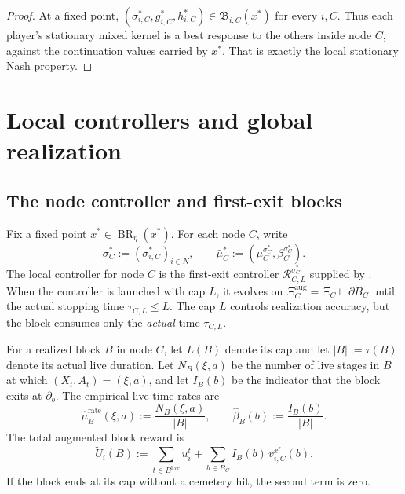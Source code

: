 \documentclass[12pt]{article}
\theoremstyle{definition}
\newcommand{\1}{\mathbf{1}}
\DeclareMathOperator{\BR}{BR}
\begin{document}
\begin{proof}
At a fixed point,
$(\sigma_{i,C}^*,g_{i,C}^*,h_{i,C}^*)\in\mathfrak B_{i,C}(x^*)$ for every $i,C$.
Thus each player's stationary mixed kernel is a best response to the others inside
node $C$, against the continuation values carried by $x^*$. That is exactly the
local stationary Nash property.
\end{proof}

\section{Local controllers and global realization}
\label{sec:realization}


\subsection{The node controller and first-exit blocks}

Fix a fixed point $x^*\in\BR_\eta(x^*)$. For each node $C$, write
\[
\sigma_C^*:=(\sigma_{i,C}^*)_{i\in N},
\qquad
\bar\mu_C^*:=(\mu_C^{\sigma_C^*},\beta_C^{\sigma_C^*}).
\]
The local controller for node $C$ is the first-exit controller
$\mathcal R_{C,L}^{\sigma_C^*}$ supplied by . When the
controller is launched with cap $L$, it evolves on
$\Xi_C^{\mathrm{aug}}=\Xi_C\sqcup\partial B_C$ until the actual stopping time
$\tau_{C,L}\le L$. The cap $L$ controls realization accuracy, but the block
consumes only the \emph{actual} time $\tau_{C,L}$.

For a realized block $B$ in node $C$, let $L(B)$ denote its cap and let
$|B|:=\tau(B)$ denote its actual live duration. Let
$N_B(\xi,a)$ be the number of live stages in $B$ at which $(X_t,A_t)=(\xi,a)$, and
let $I_B(b)$ be the indicator that the block exits at $\partial_b$. The empirical
live-time rates are
\[
\widehat\mu_B^{\mathrm{rate}}(\xi,a):=\frac{N_B(\xi,a)}{|B|},
\qquad
\widehat\beta_B(b):=\frac{I_B(b)}{|B|}.
\]
The total augmented block reward is
\begin{equation}
\label{eq:aug-block-payoff}
\widetilde U_i(B)
:=
\sum_{t\in B^{\mathrm{live}}} u_i^t
+
\sum_{b\in B_C}I_B(b)\,v_{i,C}^{x^*}(b).
\end{equation}
If the block ends at its cap without a cemetery hit, the second term is zero.
\end{document}
